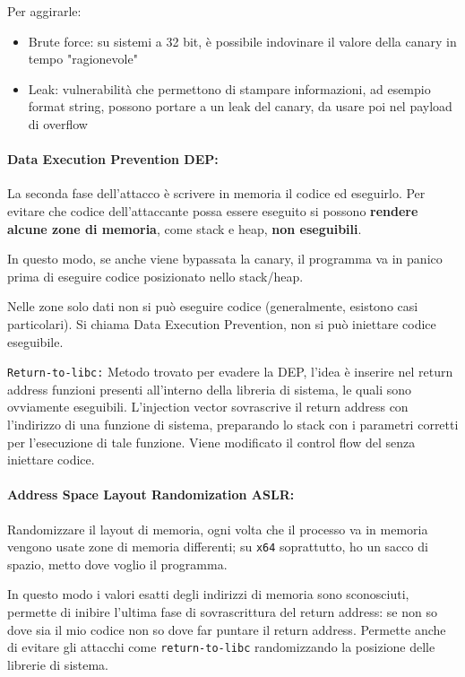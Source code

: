 Per aggirarle:
\begin{itemize}
    \item Brute force: su sistemi a 32 bit, è possibile indovinare il valore della canary in tempo "ragionevole"
    
    \item Leak: vulnerabilità che permettono di stampare informazioni, ad esempio format string, possono portare a un leak del canary, da usare poi nel payload di overflow
\end{itemize}

\paragraph{Data Execution Prevention DEP:} La seconda fase dell'attacco è scrivere in memoria il codice ed eseguirlo. Per evitare che codice dell'attaccante possa essere eseguito si possono \textbf{rendere alcune zone di memoria}, come stack e heap, \textbf{non eseguibili}. 

In questo modo, se anche viene bypassata la canary, il programma va in panico prima di eseguire codice posizionato nello stack/heap. 

Nelle zone solo dati non si può eseguire codice (generalmente, esistono casi particolari). Si chiama Data Execution Prevention, non si può iniettare codice eseguibile.

\texttt{Return-to-libc:} Metodo trovato per evadere la DEP, l'idea è inserire nel return address funzioni presenti all'interno della libreria di sistema, le quali sono ovviamente eseguibili. L'injection vector sovrascrive il return address con l'indirizzo di una funzione di sistema, preparando lo stack con i parametri corretti per l'esecuzione di tale funzione. Viene modificato il control flow del senza iniettare codice.

\paragraph{Address Space Layout Randomization ASLR:} Randomizzare il layout di memoria, ogni volta che il processo va in memoria vengono usate zone di memoria differenti; su \texttt{x64} soprattutto, ho un sacco di spazio, metto dove voglio il programma. 

In questo modo i valori esatti degli indirizzi di memoria sono sconosciuti, permette di inibire l'ultima fase di sovrascrittura del return address: se non so dove sia il mio codice non so dove far puntare il return address. Permette anche di evitare gli attacchi come \texttt{return-to-libc} randomizzando la posizione delle librerie di sistema.

